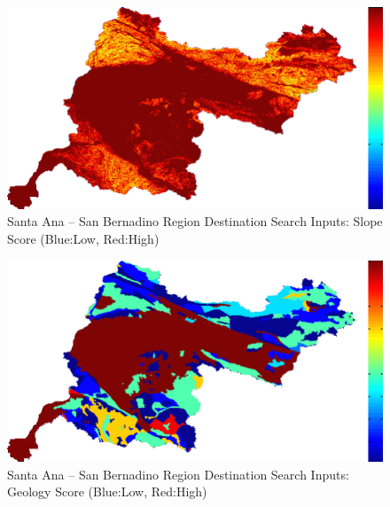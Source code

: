         \begin{figure}[!h]
            \begin{center}
            \includegraphics[width=5.5in]{figures/SanBernadino_Search_Slope.png}   
            \caption{Santa Ana -- San Bernadino Region Destination Search Inputs: Slope Score (Blue:Low, Red:High)}
            \label{fig:SASBdsinputs_slope}
            \end{center}
        \end{figure}
        
        \begin{figure}[!h]
            \begin{center}
            \includegraphics[width=5.5in]{figures/SanBernadino_Search_Geology.png}   
            \caption{Santa Ana -- San Bernadino Region Destination Search Inputs: Geology Score (Blue:Low, Red:High)}
            \label{fig:SASBdsinputs_geology}
            \end{center}
        \end{figure}
    
